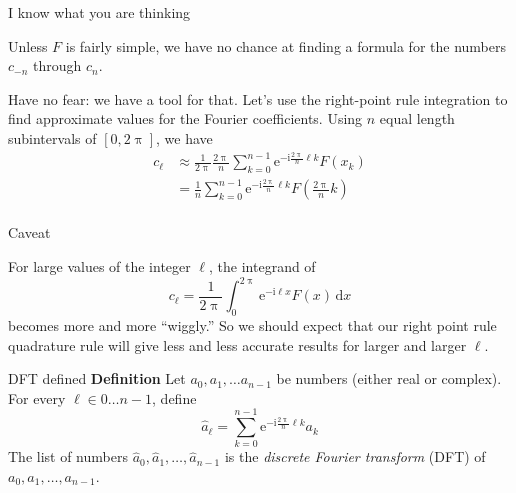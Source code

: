 \documentclass[portrait,fleqn,12pt]{beamer}
\newcommand{\euler}{\mathrm{e}}
\newcommand{\imag}{\mathrm{i}}
\newenvironment{define}[1]{
  \textbf{Definition} #1}{}
\begin{document}
 \begin{frame}{I know what you are thinking}
 
 Unless $F$ is fairly simple, we have no chance at finding a formula for the numbers $c_{-n}$ through $c_n$.  
 
 Have no fear: we have
 a tool for that.  Let's use the right-point rule integration to find approximate values for the Fourier coefficients. Using $n$ equal length 
 subintervals of $[0, 2 \uppi]$, we have
\begin{align*}
  c_\ell &\approx \frac{1}{2 \uppi}  \frac{2 \uppi}{n} \sum_{k=0}^{n-1}  \euler^{-  \imag \frac{2 \uppi}{n}  \ell  k} F(x_k) \\
            &=  \frac{1}{n} \sum_{k=0}^{n-1}  \euler^{-  \imag \frac{2 \uppi}{n}  \ell  k} F \left (\frac{2 \uppi}{n} k \right)  \\
\end{align*}
 
  \end{frame}
  
  \begin{frame}{Caveat}
  
  For large values of the integer $\ell$, the integrand of
  \begin{equation*}
   c_\ell = \frac{1}{2 \uppi} \int_0^{2 \uppi} \euler^{-\imag  \ell x} F(x) \, \mathrm{d}x
\end{equation*}
becomes more and more ``wiggly.''  So we should expect that our right point rule quadrature rule will give less and less 
accurate results for larger and larger $\ell$.
  
  \end{frame}
  
  \begin{frame}{DFT defined}
  \begin{define}  Let $a_0, a_1, \dots a_{n-1}$ be numbers (either real or complex).   For every $\ell \in 0 \dots n-1$, define
  \begin{equation*}
      \widehat a_\ell = \sum_{k=0}^{n-1}  \euler^{-  \imag \frac{2 \uppi}{n}  \ell  k} a_k
  \end{equation*}
  The list of numbers  $\widehat a_0,  \widehat a_1, \dots, \widehat a_{n-1}$ is the \emph{discrete Fourier transform} (DFT) of 
  $a_0, a_1, \dots, a_{n-1}$.
  
  \end{define}
  \end{frame}
  
\end{document}
